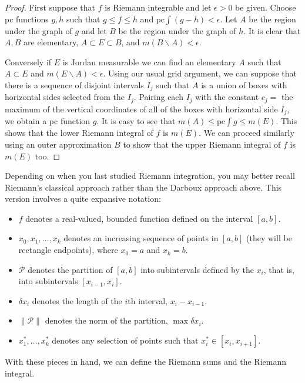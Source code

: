 \documentclass[11pt,oneside]{amsbook}
\renewcommand{\setminus}{\smallsetminus}
\theoremstyle{definition}
\theoremstyle{plain}
\theoremstyle{definition}
\theoremstyle{remark}
\numberwithin{equation}{section}
\numberwithin{figure}{section}
\begin{document}
\begin{proof}
  First suppose that $f$ is Riemann integrable and let $\epsilon>0$ be given. Choose pc functions $g,h$ such that $g\leq f\leq h$ and $\text{pc}\int(g-h)<\epsilon$. Let $A$ be the region under the graph of $g$ and let $B$ be the region under the graph of $h$. It is clear that $A,B$ are elementary, $A\subset E\subset B$, and $m(B\setminus A)<\epsilon$.

  Conversely if $E$ is Jordan measurable we can find an elementary $A$ such that $A\subset E$ and $m(E\setminus A)<\epsilon$. Using our usual grid argument, we can suppose that there is a sequence of disjoint intervals $I_j$ such that $A$ is a union of boxes with horizontal sides selected from the $I_j$. Pairing each $I_j$ with the constant $c_j=$ the maximum of the vertical coordinates of all of the boxes with horizontal side $I_j$, we obtain a pc function $g$. It is easy to see that $m(A)\leq \text{pc}\int g\leq m(E)$. This shows that the lower Riemann integral of $f$ is $m(E)$. We can proceed similarly using an outer approximation $B$ to show that the upper Riemann integral of $f$ is $m(E)$ too.
\end{proof}

Depending on when you last studied Riemann integration, you may better recall Riemann's classical approach rather than the Darboux approach above. This version involves a quite expansive notation:

\begin{itemize}
\item $f$ denotes a real-valued, bounded function defined on the interval $[a,b]$.
\item $x_0,x_1,\ldots,x_k$ denotes an increasing sequence of points in $[a,b]$ (they will be rectangle endpoints), where $x_0=a$ and $x_k=b$.
\item $\mathcal P$ denotes the partition of $[a,b]$ into subintervals defined by the $x_i$, that is, into subintervals $[x_{i-1},x_i]$.
\item $\delta x_i$ denotes the length of the $i$th interval, $x_i-x_{i-1}$.
\item $\|\mathcal P\|$ denotes the norm of the partition, $\max\delta x_i$.
\item $x_1^*,\ldots,x_k^*$ denotes any selection of points such that $x_i^*\in[x_i,x_{i+1}]$.
\end{itemize}

With these pieces in hand, we can define the Riemann sums and the Riemann integral.
\end{document}
